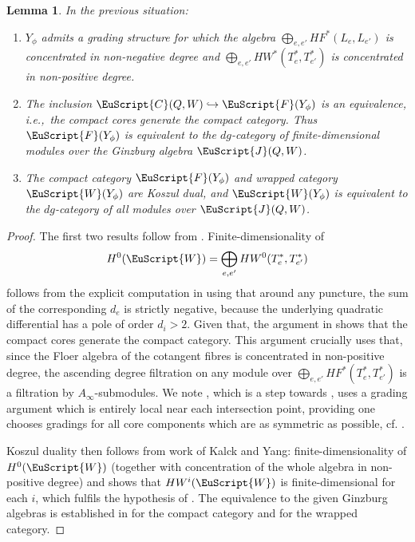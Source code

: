 \documentclass[pdftex]{sigma}
\def\scrJ{\EuScript{J}}
\newcommand{\scrF}{\EuScript{F}}
\newcommand{\scrC}{\EuScript{C}}
\def\scrW{\EuScript{W}}
\newtheorem{lem}[thm]{Lemma}
\theoremstyle{definition}
\numberwithin{equation}{section}
\begin{document}
\begin{lem}\samepage
In the previous situation:
\begin{enumerate}\itemsep=0pt
\item[$(1)$] $Y_{\phi}$ admits a grading structure for which the algebra $\bigoplus_{e,e'} HF^*(L_e,L_{e'})$ is concentrated in non-negative degree and $\bigoplus_{e,e'} HW^*(T^*_e, T^*_{e'})$ is concentrated in non-positive degree.
\item[$(2)$] The inclusion $\scrC(Q,W) \hookrightarrow \scrF(Y_{\phi})$ is an equivalence, i.e.,~the compact cores generate the compact category. Thus $\scrF(Y_{\phi})$ is equivalent to the $dg$-category of finite-dimensional modules over the Ginzburg algebra $\scrJ(Q,W)$.
\item[$(3)$] The compact category $\scrF(Y_\phi)$ and wrapped category $\scrW(Y_{\phi})$ are Koszul dual, and $\scrW(Y_{\phi})$ is equivalent to the $dg$-category of all modules over $\scrJ(Q,W)$.
\end{enumerate}
\end{lem}

\begin{proof}
The first two results follow from \cite{AbSm-plumbing}. Finite-dimensionality of
\[
H^0(\scrW) = \bigoplus_{e,e'} HW^0(T^*_e,T^*_{e'})
\]
follows from the explicit computation in \cite{Karabas-Lee} using that around any puncture, the sum of the corresponding $d_e$ is strictly negative, because the underlying quadratic differential has a pole of order $d_i > 2$. Given that, the argument in \cite[Proposition~4.2 and Lemma~4.6]{AbSm-plumbing} shows that the compact cores generate the compact category. This argument crucially uses that, since the Floer algebra of the cotangent fibres is concentrated in non-positive degree, the ascending degree filtration on any module over $\bigoplus_{e,e'} HF^*(T^*_e, T^*_{e'})$ is a filtration by $A_{\infty}$-submodules. We note \cite[Lemma~4.12]{AbSm-plumbing}, which is a step towards \cite[Proposition~4.2]{AbSm-plumbing}, uses a grading argument which is entirely local near each intersection point, providing one chooses gradings for all core components which are as symmetric as possible, cf. \cite[equation~(4.19)]{AbSm-plumbing}.

Koszul duality then follows from work of Kalck and Yang: finite-dimensionality of $H^0(\scrW)$ (together with concentration of the whole algebra in non-positive degree) and \cite[Proposition~2.5]{Kalck-Yang} shows that $HW^i(\scrW)$ is finite-dimensional for each $i$, which fulfils the hypothesis of \cite[Theorems~2.7 and~2.8]{Kalck-Yang}. The equivalence to the given Ginzburg algebras is established in \cite{Smith:quiver} for the compact category and \cite{Christ, Karabas-Lee} for the wrapped category.
\end{proof}
\end{document}
